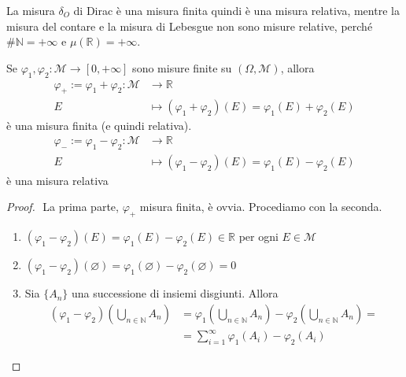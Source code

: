 \begin{example}
    La misura \(\delta_O\) di Dirac è una misura finita quindi è una misura
    relativa, mentre la misura del contare e la misura di Lebesgue non sono
    misure relative, perché \(\# \mathbb{N} = +\infty\) e \(\mu(\mathbb{R}) =
    +\infty\).
\end{example}
\begin{proposition}
    Se \(\varphi_{1}, \varphi_{2}: \mathcal{M} \to  [0, +\infty]\) sono misure
    finite su \((\Omega, \mathcal{M})\), allora 
    \begin{align*}
        \varphi_+ := \varphi_{1} + \varphi_{2}: \mathcal{M} &\longrightarrow \mathbb{R} \\
        E &\longmapsto (\varphi_{1} + \varphi_{2})(E) = \varphi_{1}(E) +
        \varphi_{2}(E)
    \end{align*}
    è una misura finita (e quindi relativa).
    \begin{align*}
        \varphi_- := \varphi_{1} - \varphi_{2}: \mathcal{M} &\longrightarrow \mathbb{R} \\
        E &\longmapsto (\varphi_{1} - \varphi_{2})(E) = \varphi_{1}(E) -
        \varphi_{2}(E)
    \end{align*}
    è una misura relativa
\end{proposition}
\begin{proof} \(\) 
La prima parte, \(\varphi_+\) misura finita, è ovvia. Procediamo con la seconda.

\begin{enumerate}[label = \arabic*.]
    \item \((\varphi_{1} - \varphi_{2})(E) = \varphi_{1}(E) - \varphi_{2}(E) \in
        \mathbb{R}\) per ogni \(E \in \mathcal{M}\) 
    \item \((\varphi_{1}-\varphi_{2})(\varnothing) = \varphi_{1}(\varnothing) -
        \varphi_{2}(\varnothing) = 0\)
    \item Sia \(\{A_{n}\} \) una successione di insiemi disgiunti. Allora
        \begin{align*}
            (\varphi_{1}-\varphi_{2})\left( \bigcup_{n \in \mathbb{N}} A_{n}
            \right) &= \varphi_{1}\left( \bigcup_{n \in \mathbb{N}} A_{n} \right)
            - \varphi_{2}\left( \bigcup_{n \in \mathbb{N}} A_{n}  \right) = \\
                    &= \sum_{i=1}^{\infty} \varphi_{1}(A_{i}) - \varphi_{2}(A_{i})
        \end{align*}
\end{enumerate}
\end{proof}

